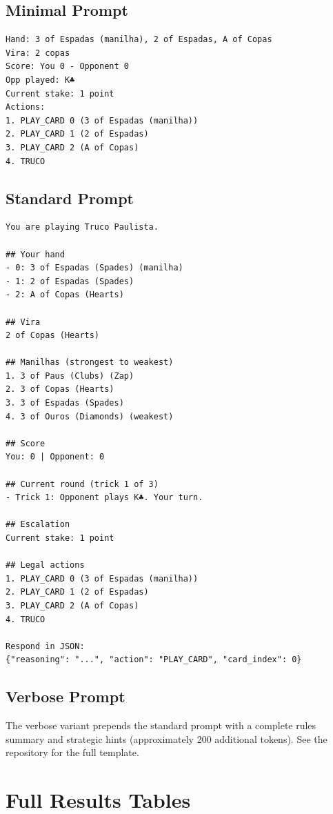 \subsection{Minimal Prompt}

\begin{verbatim}
Hand: 3 of Espadas (manilha), 2 of Espadas, A of Copas
Vira: 2 copas
Score: You 0 - Opponent 0
Opp played: K♣
Current stake: 1 point
Actions:
1. PLAY_CARD 0 (3 of Espadas (manilha))
2. PLAY_CARD 1 (2 of Espadas)
3. PLAY_CARD 2 (A of Copas)
4. TRUCO
\end{verbatim}

\subsection{Standard Prompt}

\begin{verbatim}
You are playing Truco Paulista.

## Your hand
- 0: 3 of Espadas (Spades) (manilha)
- 1: 2 of Espadas (Spades)
- 2: A of Copas (Hearts)

## Vira
2 of Copas (Hearts)

## Manilhas (strongest to weakest)
1. 3 of Paus (Clubs) (Zap)
2. 3 of Copas (Hearts)
3. 3 of Espadas (Spades)
4. 3 of Ouros (Diamonds) (weakest)

## Score
You: 0 | Opponent: 0

## Current round (trick 1 of 3)
- Trick 1: Opponent plays K♣. Your turn.

## Escalation
Current stake: 1 point

## Legal actions
1. PLAY_CARD 0 (3 of Espadas (manilha))
2. PLAY_CARD 1 (2 of Espadas)
3. PLAY_CARD 2 (A of Copas)
4. TRUCO

Respond in JSON:
{"reasoning": "...", "action": "PLAY_CARD", "card_index": 0}
\end{verbatim}

\subsection{Verbose Prompt}

The verbose variant prepends the standard prompt with a complete rules summary and strategic hints (approximately 200 additional tokens). See the repository for the full template.

\section{Full Results Tables}
\label{app:results}

